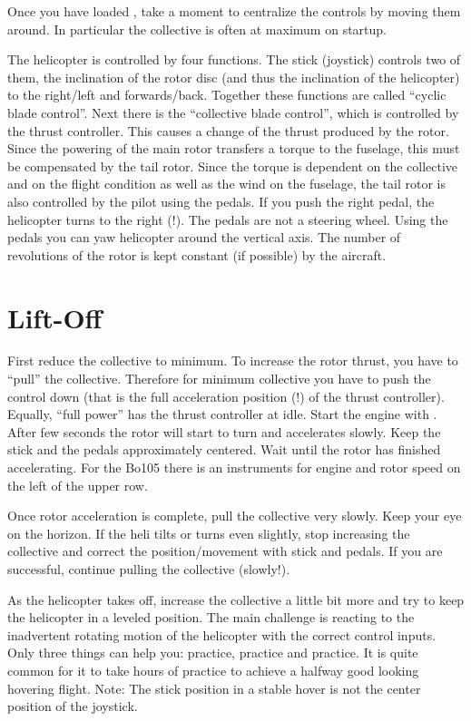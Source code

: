 Once you have loaded \FlightGear, take a moment to centralize the controls by 
moving them around. In particular the collective is often at maximum on startup. 


The helicopter is controlled by four functions. The stick (joystick) controls 
two of them, the inclination of the rotor disc (and thus the inclination of 
the helicopter) to the right/left and forwards/back. Together these functions 
are called ``cyclic blade control''. Next there is the ``collective blade 
control'', which is controlled by the thrust controller. This causes a change 
of the thrust produced by the rotor. Since the powering of the main rotor 
transfers a torque to the fuselage, this must be compensated by the 
tail rotor. Since the torque is dependent on the collective and on the flight 
condition as well as the wind on the fuselage, the tail rotor is also 
controlled by the pilot using the pedals. If you push the right pedal, 
the helicopter turns to the right (!). The pedals are not a steering wheel. 
Using the pedals you can yaw helicopter around the vertical axis. The 
number of revolutions of the rotor is kept constant (if possible) by the 
aircraft. 


\section{Lift-Off}

First reduce the collective to minimum. To increase the rotor thrust, you have 
to ``pull'' the collective. Therefore for minimum collective you have to push 
the control down (that is the full acceleration position (!) of the thrust 
controller). Equally, ``full power'' has the thrust controller at idle. 
Start the engine with \key{\}}. After few seconds the rotor will start to 
turn and accelerates slowly. Keep the stick and the pedals approximately 
centered. Wait until the rotor has finished accelerating. For the Bo105 there 
is an instruments for engine and rotor speed on the left of the upper row. 

Once rotor acceleration is complete, pull the collective very slowly. Keep 
your eye on the horizon. If the heli tilts or turns even slightly, stop 
increasing the collective and correct the position/movement with stick and 
pedals. If you are successful, continue pulling the collective (slowly!). 

As the helicopter takes off, increase the collective a little bit more and try 
to keep the helicopter in a leveled position. The main challenge is reacting 
to the inadvertent rotating motion of the helicopter with the correct control 
inputs. Only three things can help you: practice, practice and practice. 
It is quite common for it to take hours of practice to achieve a halfway good 
looking hovering flight. Note: The stick position in a stable hover is not 
the center position of the joystick. 

